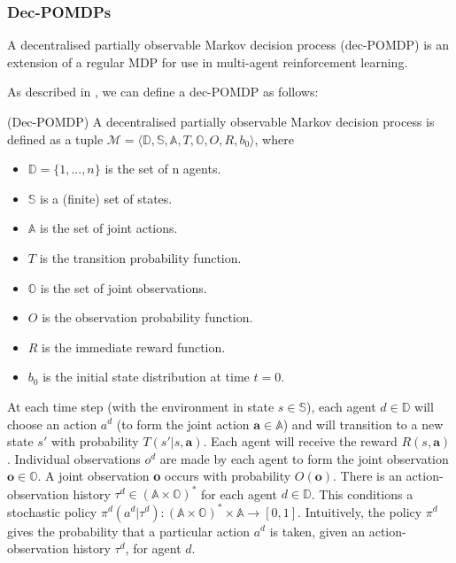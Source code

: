 \subsubsection{Dec-POMDPs}
A decentralised partially observable Markov decision process (dec-POMDP) is an extension of a regular MDP for use in multi-agent reinforcement learning. 

As described in \cite{dec-pomdp}, we can define a dec-POMDP as follows:
\begin{definition}\textbf{}{ (Dec-POMDP)}
A decentralised partially observable Markov decision
process is defined as a tuple $\mathscr{M} = \langle \mathbb{D,S,A},T,\mathbb{O},O,R,b_0\rangle$, where
\begin{itemize}
    \item $\mathbb{D}=\{1,...,n\}$ is the set of n agents.
    \item $\mathbb{S}$ is a (finite) set of states.
    \item $\mathbb{A}$ is the set of joint actions.
    \item $T$ is the transition probability function.
    \item $\mathbb{O}$ is the set of joint observations.
    \item $O$ is the observation probability function.
    \item $R$ is the immediate reward function.
    \item $b_0$ is the initial state distribution at time $t = 0$.
    
\end{itemize}
\end{definition}

At each time step (with the environment in state $s \in \mathbb{S}$), each agent $d \in \mathbb{D}$ will choose an action $a^d$ (to form the joint action $\textbf{a} \in \mathbb{A}$) and will transition to a new state $s'$ with probability $T(s'|s,\textbf{a})$. Each agent will receive the reward $R(s, \textbf{a})$. Individual observations $o^d$ are made by each agent to form the joint observation $\textbf{o} \in \mathbb{O}$. A joint observation \textbf{o} occurs with probability $O(\textbf{o})$. There is an action-observation history $\tau^d \in (\mathbb{A} \times \mathbb{O})^*$ for each agent $d \in \mathbb{D}$. This conditions a stochastic policy $\pi^d(a^d|\tau^d) : (\mathbb{A} \times \mathbb{O})^* \times \mathbb{A} \to [0, 1]$. Intuitively, the policy $\pi^d$ gives the probability that a particular action $a^d$ is taken, given an action-observation history $\tau^d$, for agent $d$.

